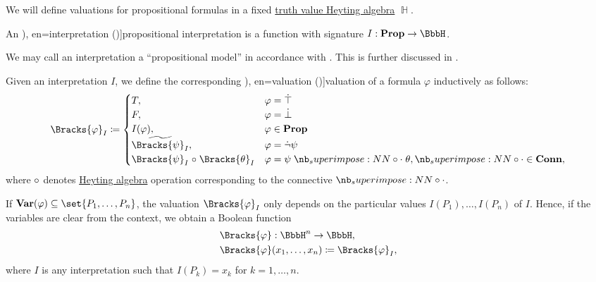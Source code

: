 \begin{definition}\label{def:propositional_valuation}\mimprovised
  We will define valuations for propositional formulas in a fixed \hyperref[def:truth_value_algebra]{truth value Heyting algebra} \( \BbbH \).

  \begin{thmenum}
     An \term[ru=интерпретация (\cite[17]{Герасимов2011}), en=interpretation (\cite[10]{Smullyan1995})]{propositional interpretation} is a function with signature \( I: \op*{Prop} \to \BbbH \).

    We may call an interpretation a \enquote{propositional model} in accordance with . This is further discussed in .

     Given an interpretation \( I \), we define the corresponding \term[ru=значение истинности (формулы) (\cite[8]{Эдельман1975}), en=valuation (\cite[10]{Smullyan1995})]{valuation} of a formula \( \varphi \) inductively as follows:
    \begin{equation}\label{eq:def:propositional_valuation/formula_valuation}
      \Bracks{\varphi}_I \coloneqq \begin{cases}
        T,                                         &\varphi = \syntop \\
        F,                                         &\varphi = \synbot \\
        I(\varphi),                                &\varphi \in \op*{Prop} \\
        \widetilde{\Bracks{\psi}_I},               &\varphi = \synneg \psi \\
        \Bracks{\psi}_I \relcirc \Bracks{\theta}_I &\varphi = \psi \syncirc \theta, {\syncirc} \in \op*{Conn},
      \end{cases}
    \end{equation}
    where \( \relcirc \) denotes \hyperref[def:heyting_algebra]{Heyting algebra} operation corresponding to the connective \( \syncirc \).

     If \( \op*{Var}(\varphi) \subseteq \set{ P_1, \ldots, P_n } \), the valuation \( \Bracks{\varphi}_I \) only depends on the particular values \( I(P_1), \ldots, I(P_n) \) of \( I \). Hence, if the variables are clear from the context, we obtain a Boolean function
    \begin{equation*}
      \begin{aligned}
        &\Bracks{\varphi}: \BbbH^n \to \BbbH, \\
        &\Bracks{\varphi}(x_1, \ldots, x_n) \coloneqq \Bracks{\varphi}_I,
      \end{aligned}
    \end{equation*}
    where \( I \) is any interpretation such that \( I(P_k) = x_k \) for \( k = 1, \ldots, n \).


\end{thmenum}
\end{definition}

